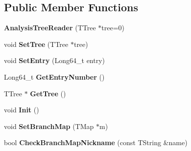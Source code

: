\subsection*{Public Member Functions}
\begin{DoxyCompactItemize}
\item 
\hypertarget{class_h_a_l_1_1_analysis_tree_reader_ac00ba35d0b860566482e32c1dfd04827}{{\bfseries Analysis\-Tree\-Reader} (T\-Tree $\ast$tree=0)}\label{class_h_a_l_1_1_analysis_tree_reader_ac00ba35d0b860566482e32c1dfd04827}

\item 
\hypertarget{class_h_a_l_1_1_analysis_tree_reader_a031181c782d3620d271a92cef995d998}{void {\bfseries Set\-Tree} (T\-Tree $\ast$tree)}\label{class_h_a_l_1_1_analysis_tree_reader_a031181c782d3620d271a92cef995d998}

\item 
\hypertarget{class_h_a_l_1_1_analysis_tree_reader_a1a9c8bc30141df5fab1163f006fb08e3}{void {\bfseries Set\-Entry} (Long64\-\_\-t entry)}\label{class_h_a_l_1_1_analysis_tree_reader_a1a9c8bc30141df5fab1163f006fb08e3}

\item 
\hypertarget{class_h_a_l_1_1_analysis_tree_reader_a6fcf94a452ec53b66d9e0e49062d4e44}{Long64\-\_\-t {\bfseries Get\-Entry\-Number} ()}\label{class_h_a_l_1_1_analysis_tree_reader_a6fcf94a452ec53b66d9e0e49062d4e44}

\item 
\hypertarget{class_h_a_l_1_1_analysis_tree_reader_a6ad8933bd6c8cc2b17179c96fd3bfcb1}{T\-Tree $\ast$ {\bfseries Get\-Tree} ()}\label{class_h_a_l_1_1_analysis_tree_reader_a6ad8933bd6c8cc2b17179c96fd3bfcb1}

\item 
\hypertarget{class_h_a_l_1_1_analysis_tree_reader_ab17ea6c10da56d9282d60d9507e01ef9}{void {\bfseries Init} ()}\label{class_h_a_l_1_1_analysis_tree_reader_ab17ea6c10da56d9282d60d9507e01ef9}

\item 
\hypertarget{class_h_a_l_1_1_analysis_tree_reader_ae3dcc57b2cc27431e89edd341b300eb6}{void {\bfseries Set\-Branch\-Map} (T\-Map $\ast$m)}\label{class_h_a_l_1_1_analysis_tree_reader_ae3dcc57b2cc27431e89edd341b300eb6}

\item 
\hypertarget{class_h_a_l_1_1_analysis_tree_reader_afa371719adcfa583fe29ea0f468b9ea8}{bool {\bfseries Check\-Branch\-Map\-Nickname} (const T\-String \&name)}\label{class_h_a_l_1_1_analysis_tree_reader_afa371719adcfa583fe29ea0f468b9ea8}


\end{DoxyCompactItemize}
